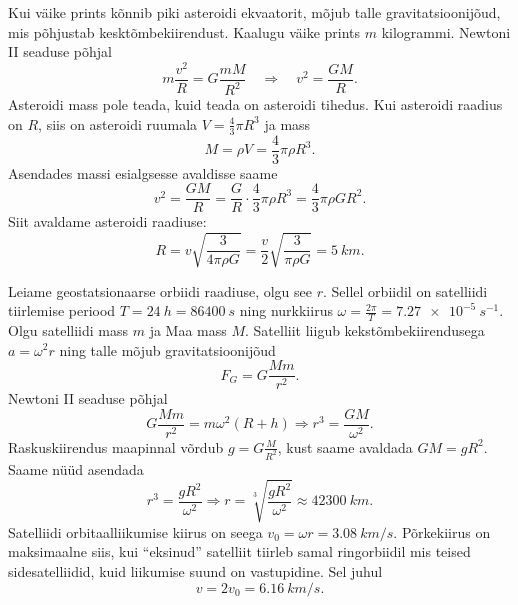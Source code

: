 \documentclass[10pt]{article}
\begin{document}
{%

\solu
Kui väike prints kõnnib piki asteroidi ekvaatorit, mõjub talle gravitatsioonijõud,
mis põhjustab kesktõmbekiirendust. Kaalugu väike prints $m$ kilogrammi. Newtoni
II seaduse põhjal
\[
m \frac{v^{2}}{R}=G \frac{m M}{R^{2}} \quad \Rightarrow \quad v^{2}=\frac{G M}{R}.
\]
Asteroidi mass pole teada, kuid teada on asteroidi tihedus. Kui asteroidi raadius on $R$, siis on asteroidi ruumala $V=\frac{4}{3} \pi R^{3}$ ja mass
\[
M=\rho V=\frac{4}{3} \pi \rho R^{3}.
\]
Asendades massi esialgsesse avaldisse saame
\[
v^{2}=\frac{G M}{R}=\frac{G}{R} \cdot \frac{4}{3} \pi \rho R^{3}=\frac{4}{3} \pi \rho G R^{2}.
\]
Siit avaldame asteroidi raadiuse:
\[
R=v \sqrt{\frac{3}{4 \pi \rho G}}=\frac{v}{2} \sqrt{\frac{3}{\pi \rho G}}=\SI{5}{km}.
\]
\probend
\bigskip


\solu
Leiame geostatsionaarse orbiidi raadiuse, olgu see $r$. Sellel orbiidil on satelliidi tiirlemise periood $T = \SI{24}{h} = \SI{86400}{s}$ ning nurkkiirus $\omega=\frac{2 \pi}{T}=\SI{7,27e-5}{s^{-1}}$. Olgu satelliidi mass $m$ ja Maa mass $M$. Satelliit liigub kekstõmbekiirendusega $a = \omega^2 r$ ning talle mõjub gravitatsioonijõud
\[
F_{G}=G \frac{M m}{r^{2}}.
\]
Newtoni II seaduse põhjal
\[
G \frac{M m}{r^{2}}=m \omega^{2}(R+h) \Rightarrow r^{3}=\frac{G M}{\omega^{2}}.
\]
Raskuskiirendus maapinnal võrdub $g=G \frac{M}{R^{2}}$, kust saame avaldada $GM = gR^2$.
Saame nüüd asendada 
\[
r^{3}=\frac{g R^{2}}{\omega^{2}} \Rightarrow r=\sqrt[3]{\frac{g R^{2}}{\omega^{2}}} \approx \SI{42300}{km}.
\]
Satelliidi orbitaalliikumise kiirus on seega $v_0 = \omega r = \SI{3,08}{km/s}$. Põrkekiirus on maksimaalne siis, kui \enquote{eksinud} satelliit tiirleb samal ringorbiidil mis teised sidesatelliidid, kuid liikumise suund on vastupidine. Sel juhul
\[
v=2 v_{0}=\SI{6,16}{km/s}.
\]
\probend
\bigskip


}
\end{document}
